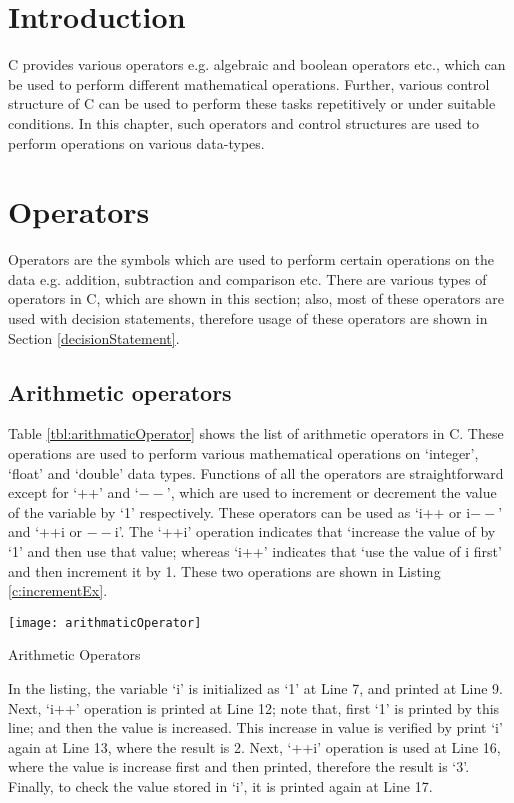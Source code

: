 \section{Introduction}
C provides various operators e.g. algebraic and boolean operators etc., which can be used to perform different mathematical operations. Further, various control structure of C can be used to perform these tasks repetitively or under suitable conditions. In this chapter, such operators and control structures are used to perform operations on various data-types.
 
\section{Operators}
Operators are the symbols which are used to perform certain operations on the data e.g. addition, subtraction and comparison etc. There are various types of operators in C, which are shown in this section; also, most of these operators are used with decision statements, therefore usage of these operators are shown in Section \ref{decisionStatement}.  

\subsection{Arithmetic operators}
Table \ref{tbl:arithmaticOperator} shows the list of arithmetic operators in C. These operations are used to perform various mathematical operations on `integer', `float' and `double' data types. Functions of all the operators are straightforward except for `++' and `$--$', which are used to increment or decrement the value of the variable by `1' respectively. These operators can be used as `i++ or i$--$' and `++i or $--$i'. The `++i' operation indicates that `increase the value of by `1' and then use that value; whereas `i++' indicates that  `use the value of i first' and then increment it by 1. These two operations are shown in Listing \ref{c:incrementEx}.  

\begin{table}[!h]
	\centering
	\texttt{[image: arithmaticOperator]}
	\caption{Arithmetic Operators}
	\label{tbl:arithmaticOperator}
\end{table}

\begin{explanation}
	In the listing, the variable `i' is initialized as `1' at Line 7, and printed at Line 9. Next, `i++' operation is printed at Line 12; note that, first `1' is printed by this line; and then the value is increased. This increase in value is verified by print `i' again at Line 13, where the result is 2. Next, `++i' operation is used at Line 16, where the value is increase first and then printed, therefore the result is `3'. Finally, to check the value stored in `i', it is printed again at Line 17.
\end{explanation}


